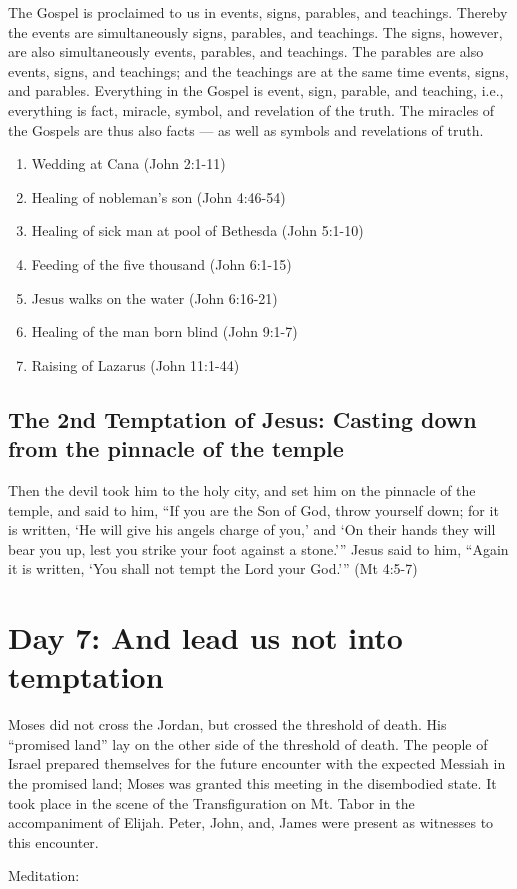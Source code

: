 \begin{quotex}
The Gospel is proclaimed to us in events, signs, parables, and teachings. Thereby the events are simultaneously signs, parables, and teachings. The signs, however, are also simultaneously events, parables, and teachings. The parables are also events, signs, and teachings; and the teachings are at the same time events, signs, and parables. Everything in the Gospel is event, sign, parable, and teaching, i.e., everything is fact, miracle, symbol, and revelation of the truth. The miracles of the Gospels are thus also facts — as well as symbols and revelations of truth.

\end{quotex}

\begin{enumerate}
\item Wedding at Cana (John 2:1-11) 
\item Healing of nobleman's son (John 4:46-54) 
\item Healing of sick man at pool of Bethesda (John 5:1-10) 
\item Feeding of the five thousand (John 6:1-15) 
\item Jesus walks on the water (John 6:16-21) 
\item Healing of the man born blind (John 9:1-7) 
\item Raising of Lazarus (John 11:1-44) 
\end{enumerate}

\subsection{The 2nd Temptation of Jesus: Casting down from the pinnacle of the temple}
Then the devil took him to the holy city, and set him on the pinnacle of the temple, and said to him, ``If you are the Son of God, throw yourself down; for it is written, `He will give his angels charge of you,' and `On their hands they will bear you up, lest you strike your foot against a stone.'{}'' Jesus said to him, ``Again it is written, `You shall not tempt the Lord your God.'{}'' (Mt 4:5-7)

\section{Day 7: And lead us not into temptation}
\begin{quotationx}
Moses did not cross the Jordan, but crossed the threshold of death. His “promised land” lay on the other side of the threshold of death. The people of Israel prepared themselves for the future encounter with the expected Messiah in the promised land; Moses was granted this meeting in the disembodied state. It took place in the scene of the Transfiguration on Mt. Tabor in the accompaniment of Elijah. Peter, John, and, James were present as witnesses to this encounter. 


\end{quotationx}
Meditation:

